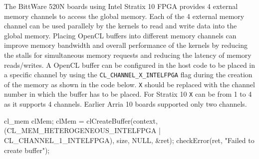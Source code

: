 The BittWare 520N boards using Intel Stratix 10 FPGA provides 4 external memory channels
to access the global memory. Each of the
4 external memory channel can be used parallely by the kernels to read and write data
into the global memory. Placing OpenCL buffers into different memory channels can
improve memory bandwidth and overall performance of the kernels by reducing the stalls
for simultaneous memory requests and reducing the latency of memory reads/writes.
A OpenCL buffer can be configured in the host code to be placed in a specific channel
by using the \texttt{CL\_CHANNEL\_X\_INTELFPGA} flag during the creation of the memory
as shown in the code below. \texttt{X} should be replaced with the channel number in which
the buffer has to be placed. For Stratix 10 \texttt{X} can be from 1 to 4 as it supports 4 channels.
Earlier Arria 10 boards supported only two channels.
\begin{CppCode}
cl_mem clMem;
clMem = clCreateBuffer(context, (CL_MEM_HETEROGENEOUS_INTELFPGA | CL_CHANNEL_1_INTELFPGA), size, NULL, &ret);
checkError(ret, "Failed to create buffer");
\end{CppCode}

